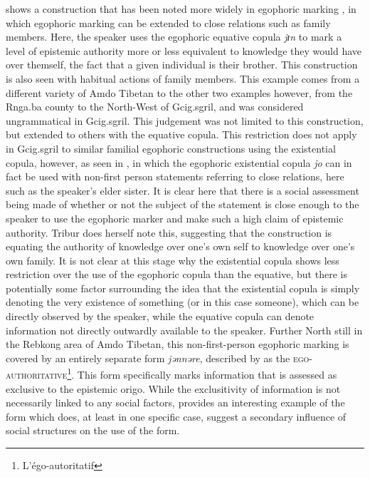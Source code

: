  shows a construction that has been noted more widely in egophoric marking \cite{EgoIntro}, in which egophoric marking can be extended to close relations such as family members. Here, the speaker uses the egophoric equative copula \textit{jɪn} to mark a level of epistemic authority more or less equivalent to knowledge they would have over themself, the fact that a given individual is their brother. This construction is also seen with habitual actions of family members. This example comes from a different variety of Amdo Tibetan to the other two examples however, from the Rnga.ba county to the North-West of Gcig.sgril, and was considered ungrammatical in Gcig.sgril. This judgement was not limited to this construction, but extended to others with the equative copula. This restriction does not apply in Gcig.sgril to similar familial egophoric constructions using the existential copula, however, as seen in , in which the egophoric existential copula \textit{jo} can in fact be used with non-first person statements referring to close relations, here such as the speaker's elder sister. It is clear here that there is a social assessment being made of whether or not the subject of the statement is close enough to the speaker to use the egophoric marker and make such a high claim of epistemic authority. Tribur does herself note this, suggesting that the construction is equating the authority of knowledge over one's own self to knowledge over one's own family. It is not clear at this stage why the existential copula shows less restriction over the use of the egophoric copula than the equative, but there is potentially some factor surrounding the idea that the existential copula is simply denoting the very existence of something (or in this case someone), which can be directly observed by the speaker, while the equative copula can denote information not directly outwardly available to the speaker. Further North still in the Rebkong area of Amdo Tibetan, this non-first-person egophoric marking is covered by an entirely separate form \textit{jənnəre}, described by  as the \textsc{ego-authoritative}\footnote{L'égo-autoritatif}. This form specifically marks information that is assessed as exclusive to the epistemic origo. While the exclusitivity of information is not necessarily linked to any social factors,  provides an interesting example of the form which does, at least in one specific case, suggest a secondary influence of social structures on the use of the form.

